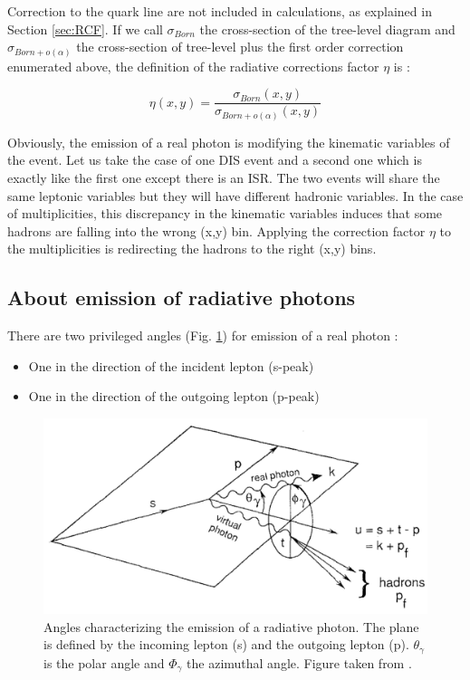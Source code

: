 Correction to the quark line are not included in calculations, as explained in Section \ref{sec:RCF}. If we call $\sigma_{Born}$ the cross-section of the tree-level diagram and $\sigma_{Born+o(\alpha)}$ the cross-section of tree-level plus the first order correction enumerated above, the definition of the radiative corrections factor $\eta$ is :

\begin{equation} \label{eq:RCF_def}
  \eta(x,y)=\frac{\sigma_{Born}(x,y)}{\sigma_{Born+o(\alpha)}(x,y)}
\end{equation}

Obviously, the emission of a real photon is modifying the kinematic variables of the event. Let us take the case of one DIS event and a second one which is exactly like the first one except there is an ISR. The two events will share the same leptonic variables but they will have different hadronic variables. In the case of multiplicities, this discrepancy in the kinematic variables induces that some hadrons are falling into the wrong (x,y) bin. Applying the correction factor $\eta$ to the multiplicities is redirecting the hadrons to the right (x,y) bins.

\subsection{About emission of radiative photons}

There are two privileged angles (Fig. \ref{fig:plan}) for emission of a real photon :
\begin{itemize}
\item One in the direction of the incident lepton (s-peak)
\item One in the direction of the outgoing lepton (p-peak)
\end{itemize}

\begin{figure}[h!]
\centering
\includegraphics[width=12cm]{gfx/plan_angle.png}
\caption{Angles characterizing the emission of a radiative photon. The plane is defined by the incoming lepton (s) and the outgoing lepton (p). $\theta_\gamma$ is the polar angle and $\Phi_\gamma$ the azimuthal angle. Figure taken from \cite{TERAD2}.}
\label{fig:plan}
\end{figure}

